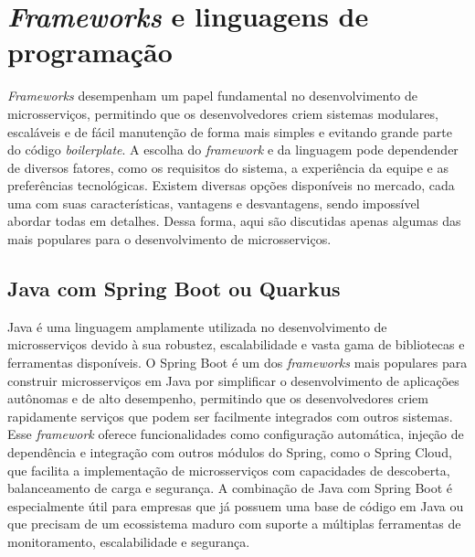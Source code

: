 

\section{\emph{Frameworks} e linguagens de programação}

\emph{Frameworks} desempenham um papel fundamental no desenvolvimento de microsserviços, permitindo que os desenvolvedores criem sistemas modulares, escaláveis e de fácil manutenção de forma mais simples e evitando grande parte do código \emph{boilerplate}. A escolha do \emph{framework} e da linguagem pode dependender de diversos fatores, como os requisitos do sistema, a experiência da equipe e as preferências tecnológicas. Existem diversas opções disponíveis no mercado, cada uma com suas características, vantagens e desvantagens, sendo impossível abordar todas em detalhes. Dessa forma, aqui são discutidas apenas algumas das mais populares para o desenvolvimento de microsserviços.

\subsection{Java com Spring Boot ou Quarkus}
Java é uma linguagem amplamente utilizada no desenvolvimento de microsserviços devido à sua robustez, escalabilidade e vasta gama de bibliotecas e ferramentas disponíveis. O Spring Boot é um dos \emph{frameworks} mais populares para construir microsserviços em Java por simplificar o desenvolvimento de aplicações autônomas e de alto desempenho, permitindo que os desenvolvedores criem rapidamente serviços que podem ser facilmente integrados com outros sistemas. Esse \emph{framework} oferece funcionalidades como configuração automática, injeção de dependência e integração com outros módulos do Spring, como o Spring Cloud, que facilita a implementação de microsserviços com capacidades de descoberta, balanceamento de carga e segurança. A combinação de Java com Spring Boot é especialmente útil para empresas que já possuem uma base de código em Java ou que precisam de um ecossistema maduro com suporte a múltiplas ferramentas de monitoramento, escalabilidade e segurança.
\cite{springboot}


